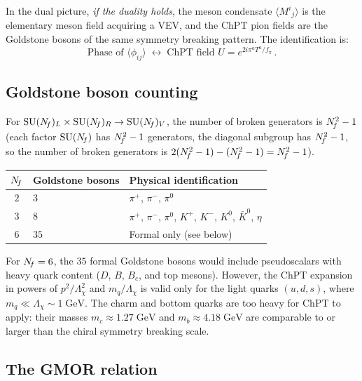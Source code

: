 \documentclass[11pt,a4paper]{article}
\newcommand{\fpi}{f_\pi}
\newcommand{\Lchi}{\Lambda_\chi}
\begin{document}
In the dual picture, \emph{if the duality holds}, the meson condensate
$\langle M^i{}_j \rangle$ is the elementary meson field acquiring a VEV,
and the ChPT pion fields are the Goldstone bosons of the same symmetry
breaking pattern.  The identification is:
\begin{equation}\label{eq:dual-chpt}
  \text{Phase of } \langle \phi_{ij} \rangle
  \;\longleftrightarrow\;
  \text{ChPT field } U = e^{2i\pi^a T^a/\fpi}\,.
\end{equation}


\subsection{Goldstone boson counting}

For $\mathrm{SU}(N_{\!f})_L \times \mathrm{SU}(N_{\!f})_R \to \mathrm{SU}(N_{\!f})_V$, the number of
broken generators is $N_{\!f}^2 - 1$ (each factor $\mathrm{SU}(N_{\!f})$ has $N_{\!f}^2 - 1$
generators, the diagonal subgroup has $N_{\!f}^2 - 1$, so the number of
broken generators is $2(N_{\!f}^2 - 1) - (N_{\!f}^2 - 1) = N_{\!f}^2 - 1$).

\begin{center}
\renewcommand{\arraystretch}{1.2}
\begin{tabular}{cll}
\toprule
$N_{\!f}$ & Goldstone bosons & Physical identification \\
\midrule
$2$ & $3$ & $\pi^+$, $\pi^-$, $\pi^0$ \\
$3$ & $8$ & $\pi^+$, $\pi^-$, $\pi^0$, $K^+$, $K^-$, $K^0$,
  $\bar{K}^0$, $\eta$ \\
$6$ & $35$ & Formal only (see below) \\
\bottomrule
\end{tabular}
\end{center}

For $N_{\!f} = 6$, the $35$ formal Goldstone bosons would include
pseudo\-scalars with heavy quark content ($D$, $B$, $B_c$, and top
mesons).  However, the ChPT expansion in powers of $p^2/\Lchi^2$ and
$m_q/\Lchi$ is valid only for the light quarks
$(u, d, s)$, where $m_q \ll \Lchi \sim 1\;\text{GeV}$.  The charm
and bottom quarks are too heavy for ChPT to apply: their masses
$m_c \approx 1.27\;\text{GeV}$ and $m_b \approx 4.18\;\text{GeV}$
are comparable to or larger than the chiral symmetry breaking scale.


\subsection{The GMOR relation}
\label{sec:gmor}
\end{document}
